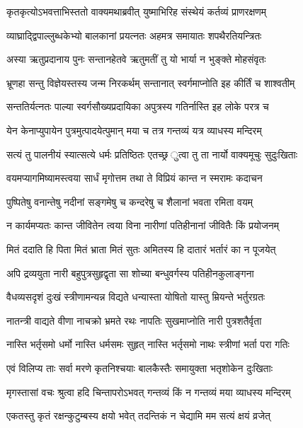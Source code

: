 \twolineshloka
{कृतकृत्योऽभवत्ताभिस्ततो वाक्यमथाब्रवीत्}
{युष्माभिरिह संस्थेयं कर्तव्यं प्राणरक्षणम्}%

\twolineshloka
{व्याघ्राद्द्विपाल्लुब्धकेभ्यो बालकानां प्रयत्नतः}
{अहमत्र समायातः शपथैरतियन्त्रितः}%

\twolineshloka
{अस्या ऋतुप्रदानाय पुनः सन्तानहेतवे}
{ऋतुमतीं तु यो भार्या न भुङ्क्ते मोहसंवृतः}%

\twolineshloka
{भ्रूणहा सन्तु विज्ञेयस्तस्य जन्म निरकर्थम्}
{सन्तानात् स्वर्गमाप्नोति इह कीर्तिं च शाश्वतीम्}%

\twolineshloka
{सन्ततिर्यत्नतः पाल्या स्वर्गसौख्यप्रदायिका}
{अपुत्रस्य गतिर्नास्ति इह लोके परत्र च}%

\twolineshloka
{येन केनाप्युपायेन पुत्रमुत्पादयेत्पुमान्}
{मया च तत्र गन्तव्यं यत्र व्याधस्य मन्दिरम्}%

\twolineshloka
{सत्यं तु पालनीयं स्यात्सत्ये धर्मः प्रतिष्ठितः}
{एतच्छ्र ुत्वा तु ता नार्यो वाक्यमूचुः सुदुःखिताः}%

\twolineshloka
{वयमप्यागमिष्यामस्त्वया सार्धं मृगोत्तम}
{तथा ते विप्रियं कान्त न स्मरामः कदाचन}%

\twolineshloka
{पुष्पितेषु वनान्तेषु नदीनां सङ्गमेषु च}
{कन्दरेषु च शैलानां भवता रमिता वयम्}%

\twolineshloka
{न कार्यमप्यतः कान्त जीवितेन त्वया विना}
{नारीणां पतिहीनानां जीवितैः किं प्रयोजनम्}%

\twolineshloka
{मितं ददाति हि पिता मितं भ्राता मितं सुतः}
{अमितस्य हि दातारं भर्तारं का न पूजयेत्}%

\twolineshloka
{अपि द्रव्ययुता नारी बहुपुत्रसुहृद्वृता}
{सा शोच्या बन्धुवर्गस्य पतिहीनकुलाङ्गना}%

\twolineshloka
{वैधव्यसदृशं दुःखं स्त्रीणामन्यन्न विद्यते}
{धन्यास्ता योषितो यास्तु म्रियन्ते भर्तुरग्रतः}%

\twolineshloka
{नातन्त्री वाद्यते वीणा नाचक्रो भ्रमते रथः}
{नापतिः सुखमाप्नोति नारी पुत्रशतैर्वृता}%

\twolineshloka
{नास्ति भर्तृसमो धर्मो नास्ति धर्मसमः सुहृत्}
{नास्ति भर्तृसमो नाथः स्त्रीणां भर्ता परा गतिः}%

\twolineshloka
{एवं विलिप्य ताः सर्वा मरणे कृतनिश्चयाः}
{बालकैस्तैः समायुक्ता भतृशोकेन दुःखिताः}%

\twolineshloka
{मृगस्तासां वचः श्रुत्वा हदि चिन्तापरोऽभवत्}
{गन्तव्यं किं न गन्तव्यं मया व्याधस्य मन्दिरम्}%

\twolineshloka
{एकतस्तु कृतं रक्षन्कुटुम्बस्य\footnotemark{} क्षयो भवेत्}
{तदन्तिकं न चेद्यामि मम सत्यं क्षयं व्रजेत्}%

